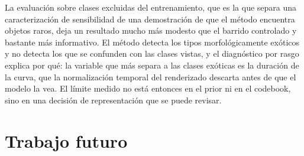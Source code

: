 La evaluación sobre clases excluidas del entrenamiento, que es la que separa una caracterización de sensibilidad de una demostración de que el método encuentra objetos raros, deja un resultado mucho más modesto que el barrido controlado y bastante más informativo. El método detecta los tipos morfológicamente exóticos y no detecta los que se confunden con las clases vistas, y el diagnóstico por rasgo explica por qué: la variable que más separa a las clases exóticas es la duración de la curva, que la normalización temporal del renderizado descarta antes de que el modelo la vea. El límite medido no está entonces en el prior ni en el codebook, sino en una decisión de representación que se puede revisar.

\section{Trabajo futuro}


